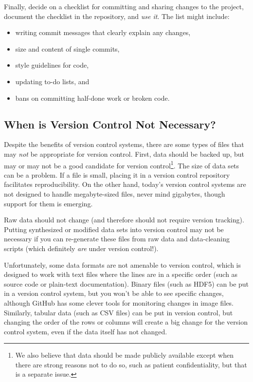 \documentclass[10pt]{article}
\begin{document}
Finally, decide on a checklist for committing and sharing changes to the
project, document the checklist in the repository, and \emph{use it}.
The list might include:

\begin{itemize}
\item
  writing commit messages that clearly explain any changes,
\item
  size and content of single commits,
\item
  style guidelines for code,
\item
  updating to-do lists, and
\item
  bans on committing half-done work or broken code.
\end{itemize}

\subsection*{When is Version Control Not Necessary?}

Despite the benefits of version control systems, there are some types
of files that may \emph{not} be appropriate for version
control. First, data should be backed up, but may or may not be a good
candidate for version control\footnote{We also believe that data
  should be made publicly available except when there are strong
  reasons not to do so, such as patient confidentiality, but that is a
  separate issue.}. The size of data sets can be a problem. If a file
is small, placing it in a version control repository facilitates
reproducibility. On the other hand, today's version control systems
are not designed to handle megabyte-sized files, never mind gigabytes,
though support for them is emerging.

Raw data should not change (and therefore should not require version
tracking). Putting synthesized or modified data sets into version
control may not be necessary if you can re-generate these files from raw
data and data-cleaning scripts (which definitely \emph{are} under
version control!).

Unfortunately, some data formats are not amenable to version control,
which is designed to work with text files where the lines are in a
specific order (such as source code or plain-text documentation). Binary
files (such as HDF5) can be put in a version control system, but you
won't be able to see specific changes, although GitHub has some clever
tools for monitoring changes in image files. Similarly, tabular data
(such as CSV files) can be put in version control, but changing the
order of the rows or columns will create a big change for the version
control system, even if the data itself has not changed.
\end{document}
